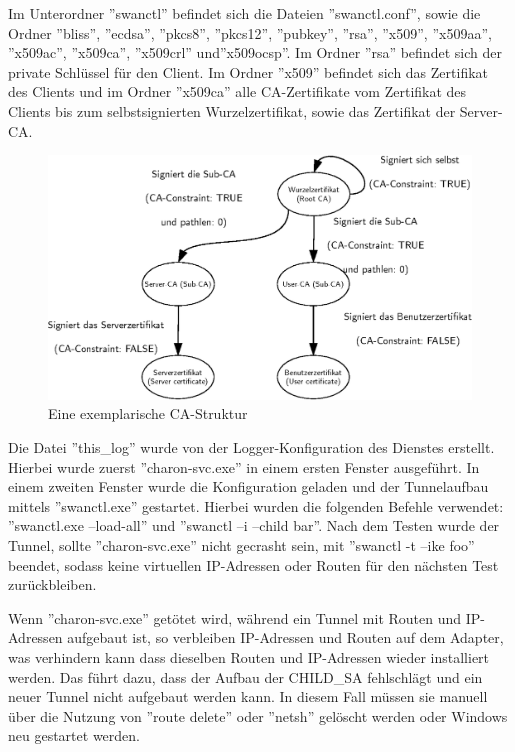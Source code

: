 {Im Unterordner ''swanctl'' befindet sich die Dateien ''swanctl.conf'',
sowie die Ordner ''bliss'', ''ecdsa'', ''pkcs8'', ''pkcs12'', ''pubkey'', ''rsa'', ''x509'',
''x509aa'', ''x509ac'', ''x509ca'', ''x509crl'' und''x509ocsp''.
Im Ordner ''rsa'' befindet sich der private Schlüssel für den Client. Im Ordner
''x509'' befindet sich das Zertifikat des Clients und im Ordner ''x509ca'' alle
\ac{CA}-Zertifikate vom Zertifikat des Clients bis zum selbstsignierten Wurzelzertifikat,
sowie das Zertifikat der Server-\ac{CA}.

\begin{figure}
\def\svgwidth{\columnwidth}
\includegraphics[width=\textwidth]{CA-Struktur.eps}
\caption{Eine exemplarische CA-Struktur}
\label{fig:CA-Struktur}
\end{figure}

Die Datei ''this\_log'' wurde von der Logger-Konfiguration des Dienstes erstellt.
Hierbei wurde zuerst ''charon-svc.exe''
in einem ersten Fenster ausgeführt. In einem zweiten Fenster wurde die Konfiguration geladen
und der Tunnelaufbau mittels ''swanctl.exe'' gestartet. Hierbei wurden die folgenden
Befehle verwendet: ''swanctl.exe --load-all'' und ''swanctl --i --child bar''.
Nach dem Testen wurde der Tunnel, sollte ''charon-svc.exe'' nicht gecrasht sein, mit ''swanctl -t --ike foo''
beendet, sodass keine virtuellen IP-Adressen oder Routen für den nächsten Test zurückbleiben.

Wenn ''charon-svc.exe'' getötet wird, während ein Tunnel mit Routen und \ac{IP}-Adressen
aufgebaut ist, so verbleiben IP-Adressen und Routen auf dem Adapter, was verhindern kann dass
dieselben Routen und \ac{IP}-Adressen wieder installiert werden. Das führt dazu, dass der
Aufbau der CHILD\_SA fehlschlägt und ein neuer Tunnel nicht aufgebaut werden kann.
In diesem Fall müssen sie manuell über die Nutzung von ''route delete'' oder ''netsh''
gelöscht werden oder Windows neu gestartet werden.

}
